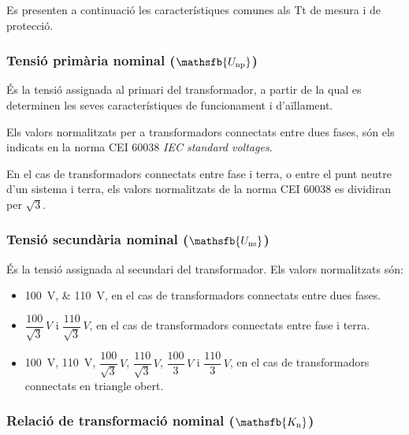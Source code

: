 Es presenten a continuació les característiques comunes als Tt de
mesura i de protecció.

\subsubsection{Tensió primària nominal ($\mathsfb{U_\text{np}}$)}

És la tensió assignada al primari del transformador, a partir de la
qual es determinen les seves característiques de funcionament i
d'aïllament.

Els valors normalitzats per a transformadors connectats entre dues fases, són els indicats en la norma CEI 60038 \textit{IEC standard voltages}.

En el cas de transformadors connectats entre fase i terra, o entre el punt neutre d'un sistema i terra, els valors normalitzats de la norma CEI 60038 es dividiran per $\sqrt{3}$.


\subsubsection{Tensió secundària nominal ($\mathsfb{U_\text{ns}}$)}

És la tensió assignada al secundari del transformador.
Els valors normalitzats són:
\begin{itemize}
    \item \qtylist{100;110}{V}, en el cas de transformadors connectats
    entre dues fases.
    \item $\dfrac{100}{\sqrt{3}}\si{\,V}$ i
        $\dfrac{110}{\sqrt{3}}\si{\,V}$, en el cas de transformadors
        connectats entre fase i terra.
    \item \qty{100}{V}, \qty{110}{V}, $\dfrac{100}{\sqrt{3}}\si{\,V}$,
    $\dfrac{110}{\sqrt{3}}\si{\,V}$, $\dfrac{100}{3}\si{\,V}$   i
    $\dfrac{110}{3}\si{\,V}$, en el cas de transformadors
    connectats en triangle obert.
\end{itemize}

\subsubsection{Relació de transformació nominal ($\mathsfb{K_\text{n}}$)}

